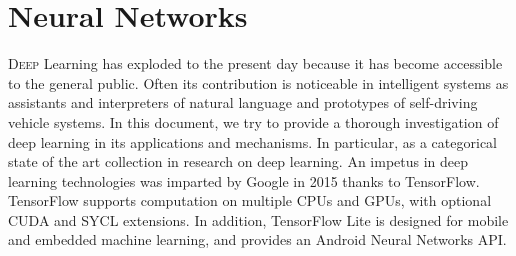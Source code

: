 \chapter{Neural Networks}
\label{chap:neuralnetworks}
%
\lettrine[lines=3]{D}{eep} Learning has exploded to the present day because it
has become accessible to the general public. Often its contribution is
noticeable in intelligent systems as assistants and interpreters of natural
language and prototypes of self-driving vehicle systems. In this document, we
try to provide a thorough investigation of deep learning in its applications and
mechanisms. In particular, as a categorical state of the art collection in
research on deep learning. An impetus in deep learning technologies was imparted
by Google in 2015 thanks to TensorFlow. TensorFlow supports computation on
multiple CPUs and GPUs, with optional CUDA and SYCL extensions. In addition,
TensorFlow Lite is designed for mobile and embedded machine learning, and
provides an Android Neural Networks API.\cite{article}
% 
% 


